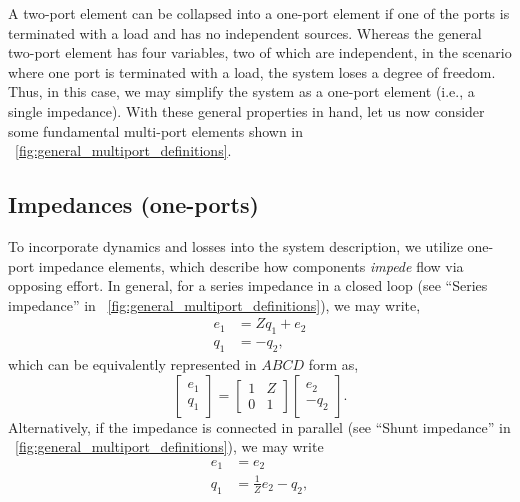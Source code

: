 \documentclass[5p,times]{elsarticle}
\begin{document}
A two-port element can be collapsed into a one-port element if one of the ports is terminated with a load and has no independent sources. 
Whereas the general two-port element has four variables, two of which are independent, in the scenario where one port is terminated with a load, the system loses a degree of freedom. 
Thus, in this case, we may simplify the system as a one-port element (i.e., a single impedance). 
With these general properties in hand, let us now consider some fundamental multi-port elements shown in \figurename~\ref{fig:general_multiport_definitions}.

\subsection{Impedances (one-ports)}\label{sec:impedances}
To incorporate dynamics and losses into the system description, we utilize one-port impedance elements, which describe how components \emph{impede} flow via opposing effort. 
In general, for a series impedance in a closed loop (see ``Series impedance'' in \figurename~\ref{fig:general_multiport_definitions}), we may write,
%
\begin{subequations}
        \begin{align}
                e_1 &= Zq_1 + e_2 \\
                q_1 &= -q_2 ,
        \end{align}
        \label{eq:impedance_eom}%
\end{subequations}
%
which can be equivalently represented in $ABCD$ form as,
%
\begin{equation}
        \begin{bmatrix}
                e_1 \\ q_1
        \end{bmatrix}
        =
        \begin{bmatrix}
                1 & Z \\ 0 & 1
        \end{bmatrix}
        \begin{bmatrix}
                e_2 \\ - q_2
        \end{bmatrix} .
        \label{eq:impedance_abcd}%
\end{equation}
%
Alternatively, if the impedance is connected in parallel (see ``Shunt impedance'' in \figurename~\ref{fig:general_multiport_definitions}), we may write
%
\begin{subequations}
        \begin{align}
                e_1 &=  e_2 \\
                q_1 &= \frac{1}{Z} e_2 - q_2 ,
        \end{align}
        \label{eq:parallel_impedance_eom}%
\end{subequations}
\end{document}

